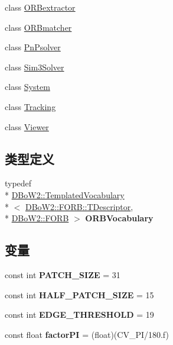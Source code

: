 \begin{DoxyCompactItemize}
\item 
class \hyperlink{classORB__SLAM2_1_1ORBextractor}{O\-R\-Bextractor}
\item 
class \hyperlink{classORB__SLAM2_1_1ORBmatcher}{O\-R\-Bmatcher}
\item 
class \hyperlink{classORB__SLAM2_1_1PnPsolver}{Pn\-Psolver}
\item 
class \hyperlink{classORB__SLAM2_1_1Sim3Solver}{Sim3\-Solver}
\item 
class \hyperlink{classORB__SLAM2_1_1System}{System}
\item 
class \hyperlink{classORB__SLAM2_1_1Tracking}{Tracking}
\item 
class \hyperlink{classORB__SLAM2_1_1Viewer}{Viewer}
\end{DoxyCompactItemize}
\subsection*{类型定义}
\begin{DoxyCompactItemize}
\item 
\hypertarget{namespaceORB__SLAM2_a2fafba714858cab1bb18d438e2e83c5d}{typedef \\*
\hyperlink{classDBoW2_1_1TemplatedVocabulary}{D\-Bo\-W2\-::\-Templated\-Vocabulary}\\*
$<$ \hyperlink{classDBoW2_1_1FORB_aef9b966d0293836fab9f55f1799ce0ed}{D\-Bo\-W2\-::\-F\-O\-R\-B\-::\-T\-Descriptor}, \\*
\hyperlink{classDBoW2_1_1FORB}{D\-Bo\-W2\-::\-F\-O\-R\-B} $>$ {\bfseries O\-R\-B\-Vocabulary}}\label{namespaceORB__SLAM2_a2fafba714858cab1bb18d438e2e83c5d}

\end{DoxyCompactItemize}
\subsection*{变量}
\begin{DoxyCompactItemize}
\item 
\hypertarget{namespaceORB__SLAM2_a557e5c298c5f7164667f083494c2197a}{const int {\bfseries P\-A\-T\-C\-H\-\_\-\-S\-I\-Z\-E} = 31}\label{namespaceORB__SLAM2_a557e5c298c5f7164667f083494c2197a}

\item 
\hypertarget{namespaceORB__SLAM2_aa09849ae679bf2392b097abd710d8d7f}{const int {\bfseries H\-A\-L\-F\-\_\-\-P\-A\-T\-C\-H\-\_\-\-S\-I\-Z\-E} = 15}\label{namespaceORB__SLAM2_aa09849ae679bf2392b097abd710d8d7f}

\item 
\hypertarget{namespaceORB__SLAM2_aec00f1ad4dea35755e3af4404282cd3b}{const int {\bfseries E\-D\-G\-E\-\_\-\-T\-H\-R\-E\-S\-H\-O\-L\-D} = 19}\label{namespaceORB__SLAM2_aec00f1ad4dea35755e3af4404282cd3b}

\item 
\hypertarget{namespaceORB__SLAM2_a8015b470ffeb885a0c90837a03b3210f}{const float {\bfseries factor\-P\-I} = (float)(C\-V\-\_\-\-P\-I/180.f)}\label{namespaceORB__SLAM2_a8015b470ffeb885a0c90837a03b3210f}

\end{DoxyCompactItemize}


